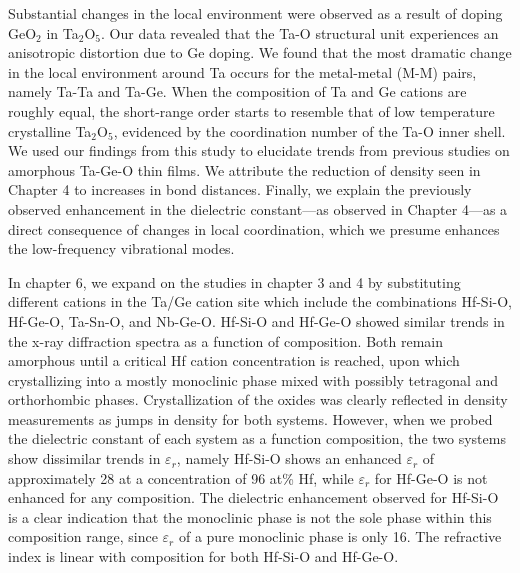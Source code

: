 Substantial changes in the local environment were observed as a result of doping GeO$_{2}$ in Ta$_{2}$O$_{5}$. Our data revealed that the Ta-O structural unit experiences an anisotropic distortion due to Ge doping. We found that the most dramatic change in the local environment around Ta occurs for the metal-metal (M-M) pairs, namely Ta-Ta and Ta-Ge. When the composition of Ta and Ge cations are roughly equal, the short-range order starts to resemble that of low temperature crystalline Ta$_{2}$O$_{5}$, evidenced by the coordination number of the Ta-O inner shell. We used our findings from this study to elucidate trends from previous studies on amorphous Ta-Ge-O thin films.
We attribute the reduction of density seen in Chapter 4 to increases in bond distances. Finally, we explain the previously observed enhancement in the dielectric constant---as observed in Chapter 4---as a direct consequence of changes in local coordination, which we presume enhances the low-frequency vibrational modes.

In chapter 6, we expand on the studies in chapter 3 and 4 by substituting different cations in the Ta/Ge cation site which include the combinations Hf-Si-O, Hf-Ge-O, Ta-Sn-O, and Nb-Ge-O. Hf-Si-O and Hf-Ge-O showed similar trends in the x-ray diffraction spectra as a function of composition. Both remain amorphous until a critical Hf cation concentration is reached, upon which crystallizing into a mostly monoclinic phase mixed with possibly tetragonal and orthorhombic phases. Crystallization of the oxides was clearly reflected in density measurements as jumps in density for both systems. However, when we probed the dielectric constant of each system as a function composition, the two systems show dissimilar trends in $\varepsilon_{r}$, namely Hf-Si-O shows an enhanced $\varepsilon_{r}$ of approximately 28 at a concentration of 96 at\% Hf, while $\varepsilon_{r}$ for Hf-Ge-O is not enhanced for any composition. The dielectric enhancement observed for Hf-Si-O is a clear indication that the monoclinic phase is not the sole phase within this composition range, since $\varepsilon_{r}$ of a pure monoclinic phase is only 16. The refractive index is linear with composition for both Hf-Si-O and Hf-Ge-O.

